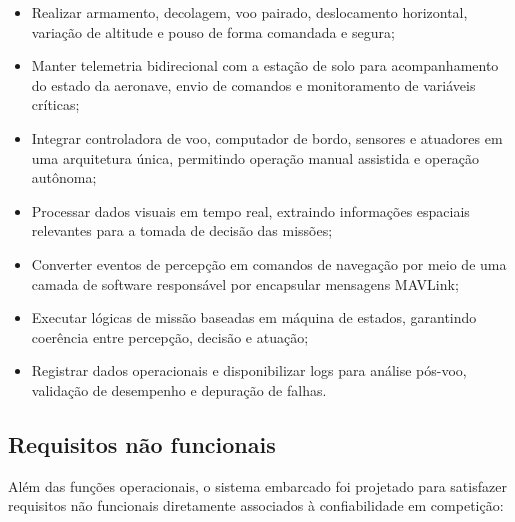 \begin{itemize}
    \item Realizar armamento, decolagem, voo pairado, deslocamento horizontal, variação de altitude e pouso de forma comandada e segura;
    \item Manter telemetria bidirecional com a estação de solo para acompanhamento do estado da aeronave, envio de comandos e monitoramento de variáveis críticas;
    \item Integrar controladora de voo, computador de bordo, sensores e atuadores em uma arquitetura única, permitindo operação manual assistida e operação autônoma;
    \item Processar dados visuais em tempo real, extraindo informações espaciais relevantes para a tomada de decisão das missões;
    \item Converter eventos de percepção em comandos de navegação por meio de uma camada de software responsável por encapsular mensagens MAVLink;
    \item Executar lógicas de missão baseadas em máquina de estados, garantindo coerência entre percepção, decisão e atuação;
    \item Registrar dados operacionais e disponibilizar logs para análise pós-voo, validação de desempenho e depuração de falhas.
\end{itemize}

\subsection{Requisitos não funcionais}

Além das funções operacionais, o sistema embarcado foi projetado para satisfazer requisitos não funcionais diretamente associados à confiabilidade em competição:

